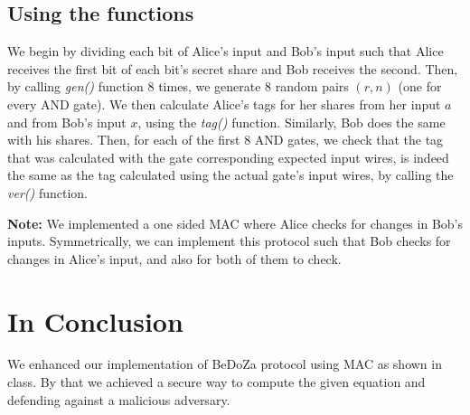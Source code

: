 \documentclass{article}
\begin{document}
\newpage

\subsection{Using the functions}

We begin by dividing each bit of Alice's input and Bob's input such that Alice receives the first bit of each bit's secret share and Bob receives the second. Then, by calling \textit{gen()} function 8 times, we generate 8 random pairs $(r,n)$ (one for every AND gate). We then calculate Alice's tags for her shares from her input $a$ and from Bob's input $x$, using the \textit{tag()} function. Similarly, Bob does the same with his shares. Then, for each of the first 8 AND gates, we check that the tag that was calculated with the gate corresponding expected input wires, is indeed the same as the tag calculated using the actual gate's input wires, by calling the \textit{ver()} function. 

\textbf{Note:} We implemented a one sided MAC where Alice checks for changes in Bob's inputs. Symmetrically, we can implement this protocol such that Bob checks for changes in Alice's input, and also for both of them to check.

\section{In Conclusion}
We enhanced our implementation of BeDoZa protocol using MAC as shown in class. By that we achieved a secure way to compute the given equation and defending against a malicious adversary.
\end{document}
